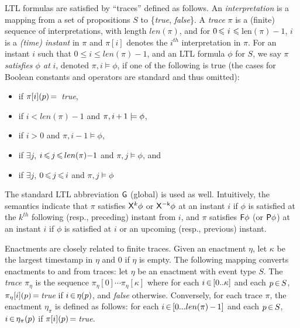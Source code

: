 LTL formulas are satisfied by ``traces'' defined as follows.
An {\em interpretation} is a mapping from a set of propositions $S$ to
\{\textit{true}, \textit{false}\}.
A {\em trace} $\pi$ is a (finite) sequence of interpretations,
with length ${len}(\pi)$, and
for $0\,{\leqslant}\,\,{i}\,\,{\leqslant}\,$len$(\pi){-}1$,
$i$ is a {\it (time) instant} in $\pi$ and
$\pi[i]$ denotes the $i^{th}$ interpretation in $\pi$.
For an instant $i$ such that $0 \le i\le {len}(\pi){-}1$,
and an LTL formula $\phi$ for $S$,
we say $\pi$ {\em satisfies $\phi$ at} $i$,
denoted $\pi, i \models \phi$,
if one of the following is true
(the cases for Boolean constants and operators are standard and thus omitted):
\begin{itemize}
\item
  if $\pi[i](p)\,{=}\,$ {\it true},
\item
  if $i<len(\pi){-}1$ and $\pi,i\,{+}\,1 \models \phi$,
\item
  if $i>0$ and $\pi,i{-}1 \models \phi$,
\item
  if $\exists j$, $i \,{\leqslant}\, j \,{\leqslant}\, len(\pi){-}1$ and
  $\pi, j \models \phi$, and
\item
  if $\exists j$,
  $0 \,{\leqslant}\, j \,{\leqslant}\, i$ and $\pi, j \models \phi$
\end{itemize}
  
The standard LTL abbreviation ${\sf G}$ (global)
is used as well.
Intuitively, the semantics indicate that
$\pi$ satisfies ${\sf X}^k \phi$ or ${\sf X^{-k}} \phi$
at an instant $i$ if
$\phi$ is satisfied at the $k^{th}$ following
(resp., preceding) instant from $i$, and
$\pi$ satisfies ${\sf F} \phi$ (or ${\sf P} \phi$)
at an instant $i$ if
$\phi$ is satisfied at $i$ or an upcoming (resp., previous)
instant.
  
Enactments are closely related to finite traces.
Given an enactment $\eta$, let $\kappa$ be the largest
timestamp in $\eta$ and $0$ if $\eta$ is empty.
The following mapping converts enactments to and from traces:
let $\eta$ be an enactment with event type $S$.
The {\em trace $\pi_{\eta}$}
is the sequence $\pi_{\eta}[0]\cdots\pi_{\eta}[\kappa]$
where
for each $i\,{\in}\, [0..\kappa]$ and each $p\,{\in}\, S$,
$\pi_\eta[i](p)\,{=}\,${\it true} if $i\,{\in}\,\eta(p)$,
and {\it false} otherwise.
Conversely,
for each trace $\pi$,
the enactment $\eta_\pi$ is defined as follows:
for each $i\,{\in}\, [0...len(\pi)\,{-}\,1]$ and each $p\,{\in}\, S$,
$i\,{\in}\,\eta_\pi(p)$ if $\pi[i](p)\,{=}\,${\it true}.


